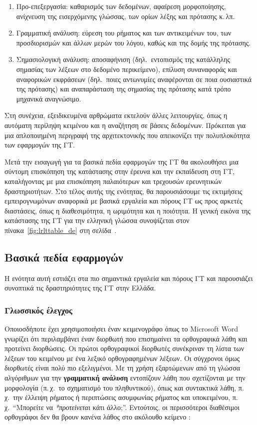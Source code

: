 \documentclass[]{../../metanetpaper}
\begin{document}
\begin{multicols}{2}
\begin{enumerate}
\item Προ-επεξεργασία: καθαρισμός των δεδομένων, αφαίρεση μορφοποίησης, ανίχνευση της εισερχόμενης γλώσσας, των ορίων λέξης και πρότασης κ.\,λπ.
\item Γραμματική ανάλυση: εύρεση του ρήματος και των αντικειμένων του, των προσδιορισμών και άλλων μερών του λόγου,  καθώς και της δομής της πρότασης.
\item Σημασιολογική ανάλυση: αποσαφήνιση (δηλ.~εντοπισμός της κατάλληλης σημασίας των λέξεων στο δεδομένο περικείμενο), επίλυση συναναφοράς και αναφορικών εκφράσεων (δηλ.~ποιες αντωνυμίες αναφέρονται σε ποια ουσιαστικά της πρότασης) και αναπαράσταση της σημασίας της πρότασης κατά τρόπο μηχανικά αναγνώσιμο.
\end{enumerate}

Στη συνέχεια, εξειδικευμένα αρθρώματα εκτελούν άλλες λειτουργίες, όπως η αυτόματη περίληψη κειμένου και η αναζήτηση σε βάσεις δεδομένων. Πρόκειται για μια απλοποιημένη περιγραφή της αρχιτεκτονικής που απεικονίζει την πολυπλοκότητα των εφαρμογών της ΓΤ. 

Μετά την εισαγωγή για τα βασικά πεδία εφαρμογών της ΓΤ θα ακολουθήσει μια σύντομη επισκόπηση της κατάστασης στην έρευνα και την εκπαίδευση στη ΓΤ, καταλήγοντας με μια επισκόπηση παλαιότερων και τρεχουσών ερευνητικών δραστηριοτήτων. Στο τέλος αυτής της ενότητας, θα παρουσιάσουμε τις εκτιμήσεις εμπειρογνωμόνων αναφορικά με βασικά εργαλεία και πόρους ΓΤ ως προς αρκετές διαστάσεις, όπως η διαθεσιμότητα, η ωριμότητα και η ποιότητα. Η γενική εικόνα της κατάστασης της ΓΤ για την ελληνική γλώσσα συνοψίζεται στον πίνακα~\ref{fig:lrlttable_de} στη σελίδα~\pageref{fig:lrlttable_de}.

\subsection{Βασικά πεδία εφαρμογών} 

Η ενότητα αυτή εστιάζει στα πιο σημαντικά εργαλεία και πόρους ΓΤ και παρουσιάζει συνοπτικά τις δραστηριότητες της ΓΤ στην Ελλάδα. 

\subsubsection{Γλωσσικός έλεγχος}

Οποιοσδήποτε έχει χρησιμοποιήσει έναν κειμενογράφο όπως το Microsoft Word γνωρίζει ότι περιλαμβάνει έναν διορθωτή που επισημαίνει τα ορθογραφικά λάθη και προτείνει διορθώσεις. Οι πρώτοι ορθογραφικοί διορθωτές συνέκριναν τη λίστα των λέξεων του κειμένου με ένα λεξικό ορθογραφημένων λέξεων. Οι σύγχρονοι όμως διορθωτές είναι πολύ πιο εξελιγμένοι.  Με τη χρήση εξαρτώμενων από τη γλώσσα αλγόριθμων για την \textbf{γραμματική ανάλυση} εντοπίζουν λάθη που σχετίζονται με την μορφολογία (π.\,χ.~το σχηματισμό του πληθυντικού), όπως και συντακτικά λάθη, π.\,χ.~την έλλειψη ρήματος ή περιπτώσεις ασυμφωνίας ρήματος και υποκειμένου, π.\,χ.~“Μπορείτε να \textit{*προτείνεται} κάτι άλλο;”. Εντούτοις, οι περισσότεροι διαθέσιμοι ορθογράφοι δεν θα βρουν κανένα λάθος στο ακόλουθο κείμενο \cite{zar1}:


\end{multicols}
\end{document}
